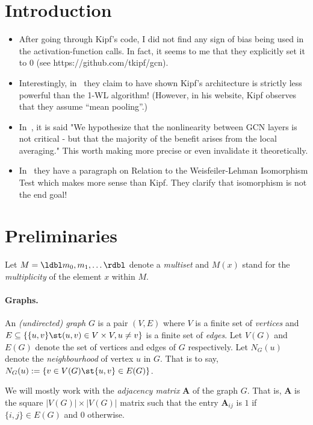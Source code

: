 \section{Introduction}
\begin{itemize}
  \item After going through Kipf's code, I did not find any sign of bias being
    used in the activation-function calls. In fact, it seems to me that they
    explicitly set it to 0 (see 
    https://github.com/tkipf/gcn).
    \item Interestingly, in~\cite{xhlj19} they claim to have shown Kipf's
      architecture is strictly less powerful than the 1-WL algorithm!
      (However, in his website, Kipf observes that they assume ``mean
      pooling''.)
   \item In~\cite{Wu2019}, it is said "We hypothesize that the nonlinearity
     between GCN layers is not critical - but that the majority of the
     benefit arises from the local averaging." This worth making more
     precise or even invalidate it theoretically.
   \item In~\cite{hyl17} they have a paragraph on Relation to the Weisfeiler-Lehman
     Isomorphism Test which makes more sense than Kipf. They clarify that
     isomorphism is not the end goal!
\end{itemize}

\section{Preliminaries}
Let $M = \ldbl m_0, m_1, \dots \rdbl$ denote a \emph{multiset} and $M(x)$
stand for the \emph{multiplicity} of the element $x$ within $M$.

\paragraph{Graphs.}
An \emph{(undirected) graph} $G$ is a pair $(V,E)$ where $V$ is a finite set
of \emph{vertices} and $E \subseteq \{\{u,v\} \st (u,v) \in V \times V, u \neq
v\}$ is a finite set of \emph{edges}. Let $V(G)$ and $E(G)$ denote the set of
vertices and edges of $G$ respectively. Let $N_G(u)$ denote the
\emph{neighbourhood} of vertex $u$ in $G$. That is to say, $N_G(u) := \{v \in V(G)
\st \{u,v\} \in E(G)\}$.

We will mostly work with the \emph{adjacency matrix} $\mathbf{A}$ of the
graph $G$. That is, $\mathbf{A}$ is the square $|V(G)| \times |V(G)|$ matrix
such that the entry $\mathbf{A}_{ij}$ is $1$ if $\{i,j\} \in E(G)$ and $0$
otherwise.

